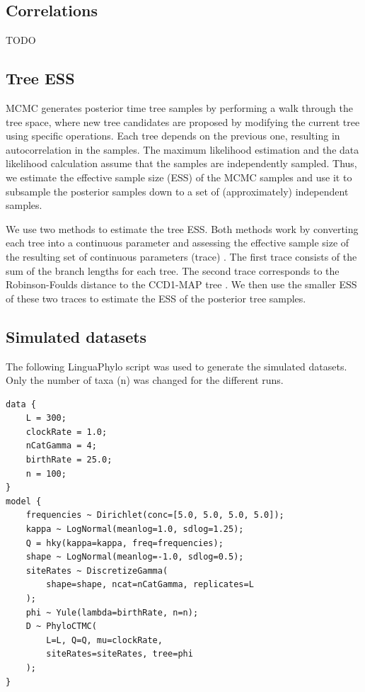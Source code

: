 \documentclass[10pt,letterpaper]{article}
\begin{document}
\subsection*{Correlations}


TODO

\subsection*{Tree ESS}

MCMC generates posterior time tree samples by performing a walk through the tree space, where new tree candidates are proposed by modifying the current tree using specific operations. Each tree depends on the previous one, resulting in autocorrelation in the samples. The maximum likelihood estimation and the data likelihood calculation assume that the samples are independently sampled. Thus, we estimate the effective sample size (ESS) of the MCMC samples and use it to subsample the posterior samples down to a set of (approximately) independent samples.

We use two methods to estimate the tree ESS. Both methods work by converting each tree into a continuous parameter and assessing the effective sample size of the resulting set of continuous parameters (trace) \cite{treeess,vehtari2021rank}. The first trace consists of the sum of the branch lengths for each tree. The second trace corresponds to the Robinson-Foulds distance to the CCD1-MAP tree \cite{ccd}. We then use the smaller ESS of these two traces to estimate the ESS of the posterior tree samples.

\subsection*{Simulated datasets}

The following LinguaPhylo script was used to generate the simulated datasets. Only the number of taxa (n) was changed for the different runs.

\begin{lstlisting}[basicstyle=\small]
data {
	L = 300;
	clockRate = 1.0;
	nCatGamma = 4;
	birthRate = 25.0;
	n = 100;
}
model {
	frequencies ~ Dirichlet(conc=[5.0, 5.0, 5.0, 5.0]);
	kappa ~ LogNormal(meanlog=1.0, sdlog=1.25);
	Q = hky(kappa=kappa, freq=frequencies);
	shape ~ LogNormal(meanlog=-1.0, sdlog=0.5);
	siteRates ~ DiscretizeGamma(
		shape=shape, ncat=nCatGamma, replicates=L
	);
	phi ~ Yule(lambda=birthRate, n=n);
	D ~ PhyloCTMC(
		L=L, Q=Q, mu=clockRate,
		siteRates=siteRates, tree=phi
	);
}
\end{lstlisting}
\end{document}
